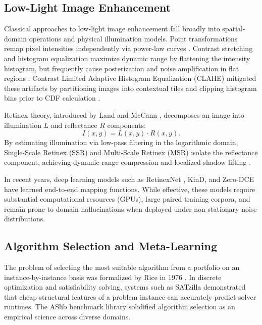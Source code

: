 \documentclass[journal]{IEEEtran}
\begin{document}
\subsection{Low-Light Image Enhancement}
Classical approaches to low-light image enhancement fall broadly into spatial-domain operations and physical illumination models. Point transformations remap pixel intensities independently via power-law curves \cite{bradski2000opencv}. Contrast stretching and histogram equalization maximize dynamic range by flattening the intensity histogram, but frequently cause posterization and noise amplification in flat regions \cite{zuiderveld1994contrast}. Contrast Limited Adaptive Histogram Equalization (CLAHE) mitigated these artifacts by partitioning images into contextual tiles and clipping histogram bins prior to CDF calculation \cite{zuiderveld1994contrast}.

Retinex theory, introduced by Land and McCann \cite{land1971lightness}, decomposes an image into illumination $L$ and reflectance $R$ components:
\begin{equation}
I(x, y) = L(x, y) \cdot R(x, y).
\end{equation}
By estimating illumination via low-pass filtering in the logarithmic domain, Single-Scale Retinex (SSR) and Multi-Scale Retinex (MSR) isolate the reflectance component, achieving dynamic range compression and localized shadow lifting \cite{jobson1997multiscale}.

In recent years, deep learning models such as RetinexNet \cite{wei2018deep}, KinD, and Zero-DCE \cite{guo2020zero} have learned end-to-end mapping functions. While effective, these models require substantial computational resources (GPUs), large paired training corpora, and remain prone to domain hallucinations when deployed under non-stationary noise distributions.

\subsection{Algorithm Selection and Meta-Learning}
The problem of selecting the most suitable algorithm from a portfolio on an instance-by-instance basis was formalized by Rice in 1976 \cite{rice1976algorithm}. In discrete optimization and satisfiability solving, systems such as SATzilla \cite{xu2008satzilla} demonstrated that cheap structural features of a problem instance can accurately predict solver runtimes. The ASlib benchmark library \cite{bischl2016aslib} solidified algorithm selection as an empirical science across diverse domains.
\end{document}
